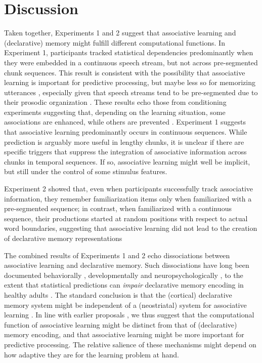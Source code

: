 \documentclass[
]{article}
\begin{document}
\clearpage

\hypertarget{discussion}{%
\section{Discussion}\label{discussion}}

Taken together, Experiments 1 and 2 suggest that associative learning
and (declarative) memory might fulfill different computational
functions. In Experiment 1, participants tracked statistical
dependencies predominantly when they were embedded in a continuous
speech stream, but not across pre-segmented chunk sequences. This result
is consistent with the possibility that associative learning is
important for predictive processing, but maybe less so for memorizing
utterances \citep{Turk-Browne2010, Sherman2020}, especially given that
speech streams tend to be pre-segmented due to their prosodic
organization
\citep{Cutler1997, Shattuck-Hufnagel1996, Brentari2011, Endress-cross-seg, Fenlon2008, Pilon1981, Christophe2001}.
These results echo those from conditioning experiments suggesting that,
depending on the learning situation, some associations are enhanced,
while others are prevented
\citep{Alberts1984, Garcia1974, Garcia1976, Gubernick1984, Martin1979}.
Experiment 1 suggests that associative learning predominantly occurs in
continuous sequences. While prediction is arguably more useful in
lengthy chunks, it is unclear if there are specific triggers that
suppress the integration of associative information across chunks in
temporal sequences. If so, associative learning might well be implicit,
but still under the control of some stimulus features.

Experiment 2 showed that, even when participants successfully track
associative information, they remember familiarization items only when
familiarized with a pre-segmented sequence; in contrast, when
familiarized with a continuous sequence, their productions started at
random positions with respect to actual word boundaries, suggesting that
associative learning did not lead to the creation of declarative memory
representations

The combined results of Experiments 1 and 2 echo dissociations between
associative learning and declarative memory. Such dissociations have
long been documented behaviorally \citep{Graf1984}, developmentally
\citep{Finn2016} and neuropsychologically
\citep{Cohen1980, Knowlton1996a, Rungratsameetaweemana2019, Poldrack2001, Squire1992},
to the extent that statistical predictions can \emph{impair} declarative
memory encoding in healthy adults \citep{Sherman2020}. The standard
conclusion is that the (cortical) declarative memory system might be
independent of a (neostriatal) system for associative learning
\citep{Knowlton1996a, Poldrack2001, Squire1992}. In line with earlier
proposals \citep{Goujon2015, Turk-Browne2010, Sherman2020}, we thus
suggest that the computational function of associative learning might be
distinct from that of (declarative) memory encoding, and that
associative learning might be more important for predictive processing.
The relative salience of these mechanisms might depend on how adaptive
they are for the learning problem at hand.
\end{document}
